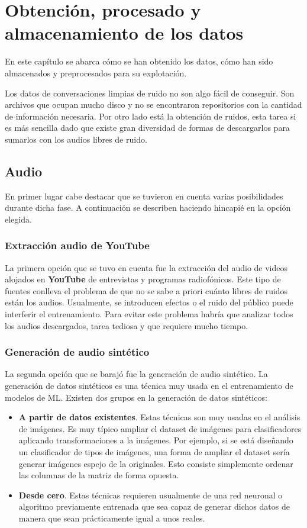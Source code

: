 \chapter{Obtención, procesado y almacenamiento de los datos} \label{ch: dataGathering}
En este capítulo se abarca cómo se han obtenido los datos, cómo han sido almacenados y preprocesados para su explotación.

Los datos de conversaciones limpias de ruido no son algo fácil de conseguir. Son archivos que ocupan mucho disco y no se encontraron repositorios con la cantidad de información necesaria. Por otro lado está la obtención de ruidos, esta tarea si es más sencilla dado que existe gran diversidad de formas de descargarlos para sumarlos con los audios libres de ruido.

\section{Audio}
En primer lugar cabe destacar que se tuvieron en cuenta varias posibilidades durante dicha fase. A continuación se describen haciendo hincapié en la opción elegida.

\subsection{Extracción audio de YouTube}
La primera opción que se tuvo en cuenta fue la extracción del audio de videos alojados en \textbf{YouTube} de entrevistas y programas radiofónicos. Este tipo de fuentes conlleva el problema de que no se sabe a priori cuánto libres de ruidos están los audios. Usualmente, se introducen efectos o el ruido del público puede interferir el entrenamiento. Para evitar este problema habría que analizar todos los audios descargados, tarea tediosa y que requiere mucho tiempo.

\subsection{Generación de audio sintético}
La segunda opción que se barajó fue la generación de audio sintético. La generación de datos sintéticos es una técnica muy usada en el entrenamiento de modelos de \gls{ML}. Existen dos grupos en la generación de datos sintéticos:
\begin{itemize}
	\item \textbf{A partir de datos existentes}. Estas técnicas son muy usadas en el análisis de imágenes. Es muy típico ampliar el \MakeLowercase{\gls{dataset}} de imágenes para clasificadores aplicando transformaciones a la imágenes. Por ejemplo, si se está diseñando un clasificador de tipos de imágenes, una forma de ampliar el \gls{dataset} sería generar imágenes espejo de la originales. Esto consiste simplemente ordenar las columnas de la matriz de forma opuesta.
	\item \textbf{Desde cero}. Estas técnicas requieren usualmente de una red neuronal o algoritmo previamente entrenada que sea capaz de generar dichos datos de manera que sean prácticamente igual a unos reales.
\end{itemize}

